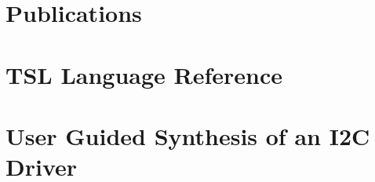 \documentclass[a4paper,twoside,openright,11pt,oldfontcommands]{memoir}
\theoremstyle{definition}
\begin{document}
\tableofcontents
\clearpage

\listoffigures

\listoftables

\chapter{Publications}

\mainmatter











\appendix
\chapter{TSL Language Reference}
\chapter{User Guided Synthesis of an I2C Driver}

\backmatter
\cleardoublepage


\end{document}

